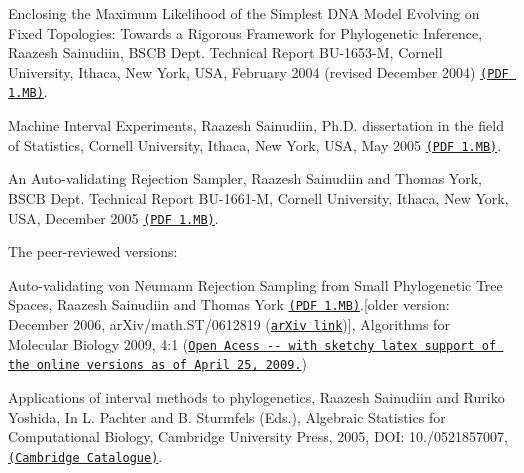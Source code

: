 \begin{DoxyEnumerate}
\item \-Enclosing the \-Maximum \-Likelihood of the \-Simplest \-D\-N\-A \-Model \-Evolving on \-Fixed \-Topologies\-: \-Towards a \-Rigorous \-Framework for \-Phylogenetic \-Inference, \-Raazesh \-Sainudiin, \-B\-S\-C\-B \-Dept. \-Technical \-Report \-B\-U-\/1653-\/\-M, \-Cornell \-University, \-Ithaca, \-New \-York, \-U\-S\-A, \-February 2004 (revised \-December 2004) \href{http://www.math.canterbury.ac.nz/~r.sainudiin/preprints/GOPJC69manuscript.pdf}{\tt (\-P\-D\-F 1.\-M\-B)}.


\item \-Machine \-Interval \-Experiments, \-Raazesh \-Sainudiin, \-Ph.\-D. dissertation in the field of \-Statistics, \-Cornell \-University, \-Ithaca, \-New \-York, \-U\-S\-A, \-May 2005 \href{http://www.math.canterbury.ac.nz/~r.sainudiin/preprints/PHD.pdf}{\tt (\-P\-D\-F 1.\-M\-B)}.


\item \-An \-Auto-\/validating \-Rejection \-Sampler, \-Raazesh \-Sainudiin and \-Thomas \-York, \-B\-S\-C\-B \-Dept. \-Technical \-Report \-B\-U-\/1661-\/\-M, \-Cornell \-University, \-Ithaca, \-New \-York, \-U\-S\-A, \-December 2005 \href{http://www.math.canterbury.ac.nz/~r.sainudiin/preprints/AutoValidSampler.pdf}{\tt (\-P\-D\-F 1.\-M\-B)}.


\end{DoxyEnumerate}

\-The peer-\/reviewed versions\-: 
\begin{DoxyEnumerate}
\item \-Auto-\/validating von \-Neumann \-Rejection \-Sampling from \-Small \-Phylogenetic \-Tree \-Spaces, \-Raazesh \-Sainudiin and \-Thomas \-York \href{http://www.math.canterbury.ac.nz/~r.sainudiin/preprints/AutoValidPhyloSampler.pdf}{\tt (\-P\-D\-F 1.\-M\-B)}.\mbox{[}older version\-: \-December 2006, ar\-Xiv/math.\-S\-T/0612819 (\href{http://arxiv.org/abs/math.ST/0612819}{\tt ar\-Xiv link})\mbox{]}, \-Algorithms for \-Molecular \-Biology 2009, 4\-:1 (\href{http://www.almob.org/content/4/1/1}{\tt \-Open \-Acess -\/-\/ with sketchy latex support of the online versions as of \-April 25, 2009.})


\item \-Applications of interval methods to phylogenetics, \-Raazesh \-Sainudiin and \-Ruriko \-Yoshida, \-In \-L. \-Pachter and \-B. \-Sturmfels (\-Eds.), \-Algebraic \-Statistics for \-Computational \-Biology, \-Cambridge \-University \-Press, 2005, \-D\-O\-I\-: 10./0521857007, \href{http://www.cambridge.org/uk/catalogue/catalogue.asp?isbn=9780521857000}{\tt (\-Cambridge \-Catalogue)}.


\end{DoxyEnumerate}



